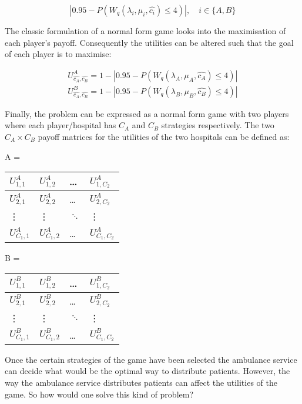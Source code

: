 \documentclass{article}
\begin{document}
\begin{equation}
    |0.95 - P(W_q(\lambda_i, \mu_i, \hat{c_i}) \leq 4)|, \quad i \in \{A,B\}
\end{equation}

The classic formulation of a normal form game looks into the maximisation of each player's payoff. Consequently the utilities can be altered such that the goal of each player is to maximise:

\begin{align}\label{Utilities}
    U_{\hat{c_A}, \hat{c_B}} ^ {A} = 1 - |0.95 - P(W_q(\lambda_A, \mu_A, \hat{c_A}) \leq 4)| \\
    U_{\hat{c_A}, \hat{c_B}} ^ {B} = 1 - |0.95 - P(W_q(\lambda_B, \mu_B, \hat{c_B}) \leq 4)|
\end{align}

Finally, the problem can be expressed as a normal form game with two players where each player/hospital has $C_A$ and $C_B$ strategies respectively. The two $C_A \times C_B$ payoff matrices for the utilities of the two hospitals can be defined as:

\begin{table}[h]
    \centering
    \begin{minipage}{.5\linewidth}
        A = 
        \begin{tabular}{|l|l|l|l|}
            \hline
            $U_{1,1}^A$ & $U_{1,2}^A$ & \dots & $U_{1,C_2}^A$ \\ \hline
            $U_{2,1}^A$ & $U_{2,2}^A$ & \dots & $U_{2,C_2}^A$ \\ \hline
            \vdots & \vdots & $\ddots$ & \vdots \\ \hline
            $U_{C_1,1}^A$ & $U_{C_1,2}^A$ & \dots & $U_{C_1,C_2}^A$ \\ \hline
        \end{tabular}
    \end{minipage}%
    \begin{minipage}{.5\linewidth}
        B = 
        \begin{tabular}{|l|l|l|l|}
            \hline
            $U_{1,1}^B$ & $U_{1,2}^B$ & \dots & $U_{1,C_2}^B$ \\ \hline
            $U_{2,1}^B$ & $U_{2,2}^B$ & \dots & $U_{2,C_2}^B$ \\ \hline
            \vdots & \vdots & $\ddots$ & \vdots \\ \hline
            $U_{C_1,1}^B$ & $U_{C_1,2}^B$ & \dots & $U_{C_1,C_2}^B$ \\ \hline
        \end{tabular}
    \end{minipage}
\end{table}  
Once the certain strategies of the game have been selected the ambulance service can decide what would be the optimal way to distribute patients. However, the way the ambulance service distributes patients can affect the utilities of the game. So how would one solve this kind of problem?
 
\end{document}
